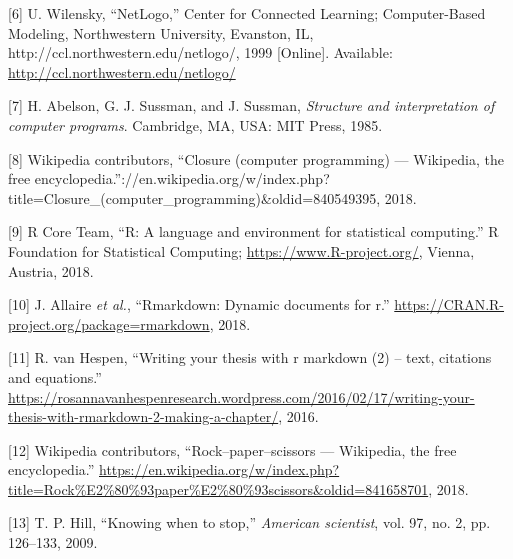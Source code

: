 \documentclass[]{article}
\begin{document}
\hypertarget{ref-Wilensky:1999}{}
{[}6{]} U. Wilensky, ``NetLogo,'' Center for Connected Learning;
Computer-Based Modeling, Northwestern University, Evanston, IL,
http://ccl.northwestern.edu/netlogo/, 1999 {[}Online{]}. Available:
\url{http://ccl.northwestern.edu/netlogo/}

\hypertarget{ref-Abelson:1985:SIC:26777}{}
{[}7{]} H. Abelson, G. J. Sussman, and J. Sussman, \emph{Structure and
interpretation of computer programs}. Cambridge, MA, USA: MIT Press,
1985.

\hypertarget{ref-wiki:closure}{}
{[}8{]} Wikipedia contributors, ``Closure (computer programming) ---
Wikipedia, the free
encyclopedia.''://en.wikipedia.org/w/index.php?title=Closure\_(computer\_programming)\&oldid=840549395,
2018.

\hypertarget{ref-rcore2018r}{}
{[}9{]} R Core Team, ``R: A language and environment for statistical
computing.'' R Foundation for Statistical Computing;
\url{https://www.R-project.org/}, Vienna, Austria, 2018.

\hypertarget{ref-allaire2018rmarkdown}{}
{[}10{]} J. Allaire \emph{et al.}, ``Rmarkdown: Dynamic documents for
r.'' \url{https://CRAN.R-project.org/package=rmarkdown}, 2018.

\hypertarget{ref-vanhespen2016thesis}{}
{[}11{]} R. van Hespen, ``Writing your thesis with r markdown (2) --
text, citations and equations.''
\url{https://rosannavanhespenresearch.wordpress.com/2016/02/17/writing-your-thesis-with-rmarkdown-2-making-a-chapter/},
2016.

\hypertarget{ref-wiki:roshambo}{}
{[}12{]} Wikipedia contributors, ``Rock--paper--scissors --- Wikipedia,
the free encyclopedia.''
\url{https://en.wikipedia.org/w/index.php?title=Rock\%E2\%80\%93paper\%E2\%80\%93scissors\&oldid=841658701},
2018.

\hypertarget{ref-hill2009knowing}{}
{[}13{]} T. P. Hill, ``Knowing when to stop,'' \emph{American
scientist}, vol. 97, no. 2, pp. 126--133, 2009.
\end{document}
